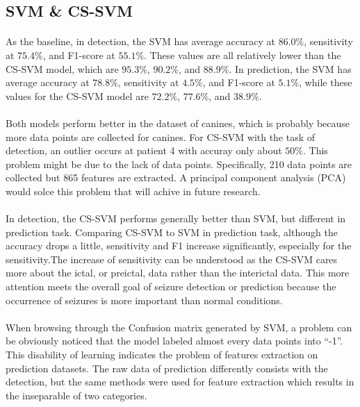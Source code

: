 \documentclass[10pt,twocolumn,letterpaper]{article}
\begin{document}
\subsection{SVM \& CS-SVM}
\paragraph{} As the baseline, in detection, the SVM has average accuracy at $86.0\%$, sensitivity at $75.4\%$, and F1-score at $55.1\%$. These values are all relatively lower than the CS-SVM model, which are $95.3\%$, $90.2\%$, and $88.9\%$. In prediction, the SVM has average accuracy at $78.8\%$, sensitivity at $4.5\%$, and F1-score at $5.1\%$, while these values for the CS-SVM model are $72.2\%$, $77.6\%$, and $38.9\%$. 
\paragraph{}Both models perform better in the dataset of canines, which is probably because more data points are collected for canines. For CS-SVM with the task of detection, an outlier occurs at patient 4 with accuray only about $50\%$. This problem might be due to the lack of data points. Specifically, 210 data points are collected but 865 features are extracted. A principal component analysis (PCA) would solce this problem that will achive in future research. 
\paragraph{}In detection, the CS-SVM performs generally better than SVM, but different in prediction task. Comparing CS-SVM to SVM in prediction task, although the accuracy drops a little, sensitivity and F1 increase significantly, especially for the sensitivity.The increase of sensitivity can be understood as the CS-SVM cares more about the ictal, or preictal, data rather than the interictal data. This more attention meets the overall goal of seizure detection or prediction because the occurrence of seizures is more important than normal conditions.
\paragraph{}When browsing through the Confusion matrix generated by SVM, a problem can be obviously noticed that the model labeled almost every data points into ``-1''. This disability of learning indicates the problem of features extraction on prediction datasets. The raw data of prediction differently consists with the detection, but the same methods were used for feature extraction which results in the inseparable of two categories.
\end{document}
